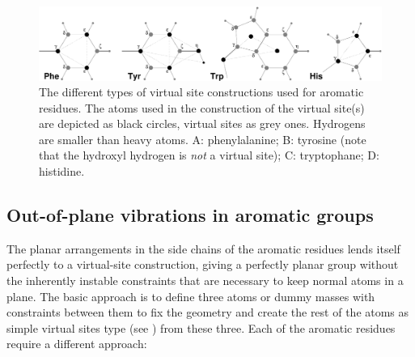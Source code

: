 \begin{figure}
\centerline{\includegraphics[width=15cm]{plots/dumaro}}
\caption[Virtual site constructions for aromatic residues.]{The
different types of virtual site constructions used for aromatic
residues. The atoms used in the construction of the virtual site(s) are
depicted as black circles, virtual sites as grey ones. Hydrogens are
smaller than heavy atoms. {\sf A}: phenylalanine; {\sf B}: tyrosine
(note that the hydroxyl hydrogen is {\em not} a virtual site); {\sf C}:
tryptophane; {\sf D}: histidine.}
\label{fig:vistearo}
\end{figure}

\subsection{Out-of-plane vibrations in aromatic groups}
\label{sec:vsitearo}
The planar arrangements in the side chains of the aromatic residues
lends itself perfectly to a virtual-site construction, giving a
perfectly planar group without the inherently instable constraints
that are necessary to keep normal atoms in a plane. The basic approach
is to define three atoms or dummy masses with constraints between them
to fix the geometry and create the rest of the atoms as simple virtual
sites type (see ) from these three. Each of
the aromatic residues require a different approach:

